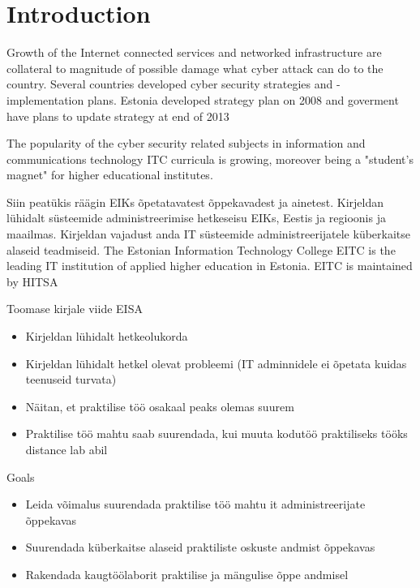 \chapter{Introduction}
\label{Introduction}



\par 
Growth of the Internet connected services and networked infrastructure are collateral to magnitude of possible damage what cyber attack can do to the country. Several countries developed cyber security strategies and -implementation plans.
Estonia developed strategy plan on 2008 \citep{Strategy2008} and goverment have plans to update strategy at end of 2013 \citep{StrategyProposal2013}
  
  
The popularity of the cyber security related subjects in information and communications technology \gls{ITC} curricula is growing, moreover being a "student's magnet" for higher educational institutes.\citep{CyberIsHot}
  


Siin peatükis räägin EIKs õpetatavatest õppekavadest ja ainetest. Kirjeldan lühidalt süsteemide administreerimise hetkeseisu EIKs, Eestis ja regioonis ja maailmas. Kirjeldan vajadust anda IT süsteemide administreerijatele küberkaitse alaseid teadmiseid.
The Estonian Information Technology College \gls{EITC} is the leading IT institution of applied higher education in Estonia. \cite{EITC} \gls{EITC} is maintained by \gls{HITSA}


Toomase kirjale viide \gls{EISA}


\begin{itemize}
	\item Kirjeldan lühidalt hetkeolukorda
	\item Kirjeldan lühidalt hetkel olevat probleemi (IT adminnidele ei õpetata kuidas teenuseid turvata)
	\item Näitan, et praktilise töö osakaal peaks olemas suurem
	\item Praktilise töö mahtu saab suurendada, kui muuta kodutöö praktiliseks tööks distance lab abil
	
\end{itemize}

Goals
\begin{itemize}
	\item Leida võimalus suurendada praktilise töö mahtu it administreerijate õppekavas
	\item Suurendada küberkaitse alaseid praktiliste oskuste andmist õppekavas
	\item Rakendada kaugtöölaborit praktilise ja mängulise õppe andmisel
\end{itemize}


